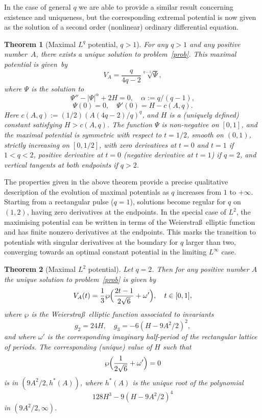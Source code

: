 \documentclass[JEP,XML,SOM,Unicode,NoEqCountersInSection,NoFloatCountersInSection]{cedram}
\theoremstyle{plain}
\newtheorem{thmx}{Theorem}
\theoremstyle{definition}
\let\balpha q
\begin{document}
In the case of general $\balpha$ we are able to provide a similar result concerning existence and uniqueness, but the corresponding
extremal potential is now given as the solution of a second order (nonlinear) ordinary differential equation.

\begin{thmx}[Maximal $L^\balpha$ potential, $\balpha>1$] \label{thm2}
For any $\balpha>1$ and any positive number~$A$, there exists a unique solution to problem~\eqref{prob}.
This maximal potential is given~by
\[
V_{A} = \frac{\balpha}{4\balpha-2}\sqrt[\balpha-1]{\Psi},
\]
where $\Psi$ is the solution to
\[
\Psi''-|\Psi|^\alpha+2H = 0,\quad \alpha:=\balpha/(\balpha-1),
\]
\[
\Psi(0)=0,\quad \Psi'(0)=H-c(A,\balpha).
\]
Here $c(A,\balpha):=(1/2)(A(4\balpha-2)/\balpha)^\balpha$, and $H$ is a
(uniquely defined) constant satisfying $H>c(A,\balpha)$.
The function $\Psi$ is non-negative on $[0,1]$, and
the maximal potential is symmetric with respect to $t=1/2$, smooth on $(0,1)$,
strictly increasing on $[0,1/2]$,
with zero derivatives at $t=0$ and $t=1$ if $1<\balpha<2$, positive derivative at $t=0$
(\resp negative derivative at $t=1$) if $\balpha=2$, and vertical tangents at both
endpoints if $q>2$.
\end{thmx}

The properties given in the above theorem provide a precise qualitative description of the evolution of maximal potentials as
$q$ increases from $1$ to $+\infty$. Starting from a rectangular pulse ($q=1$), solutions become regular for $q$ on $(1,2)$, having
zero derivatives at the endpoints. In the special case of $L^{2}$, the maximising
potential can be written in terms of the Weierstra\ss\ elliptic function
and has finite nonzero derivatives at the endpoints. This marks the transition to potentials with singular derivatives at the boundary
for $\balpha$ larger than two, converging towards an optimal constant potential in the limiting $L^{\infty}$ case.

\begin{thmx}[Maximal $L^2$ potential] \label{thm3}
Let $\balpha=2$. Then for any positive number $A$ the unique solution to problem~\eqref{prob}
is given by
\[
V_A(t) = \frac{1}{3}\wp\Bigl(\frac{2t-1}{2\sqrt{6}}+\omega'\Bigr),\quad t \in [0,1],
\]
where $\wp$ is the Weierstra\ss\ elliptic function associated to invariants
\[
g_2 = 24 H,\quad g_3 = -6(H-9A^2/2)^2,
\]
and where $\omega'$ is the corresponding
imaginary half-period of the rectangular lattice of
periods. The corresponding (unique) value of $H$ such that
\[
\wp\Bigl(\frac{1}{2\sqrt{6}}+\omega'\Bigr) = 0
\]
is in $(9A^2/2,h^*(A))$, where $h^*(A)$ is the unique root of the polynomial
\[
128 H^3-9(H-9A^2/2)^4
\]
in $(9A^2/2,\infty)$.
\end{thmx}
\end{document}
